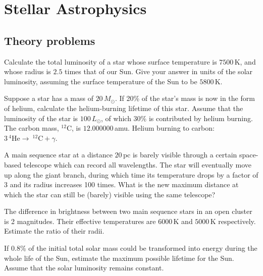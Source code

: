 \chapter{Stellar Astrophysics}

\section*{Theory problems}

Calculate the total luminosity of a star whose surface temperature is $7500$\,K,
and whose radius is $2.5$ times that of our Sun. Give your answer in units of the
solar luminosity, assuming the surface temperature of the Sun to be $5800$\,K.

Suppose a star has a mass of $20\,M_\odot$. If 20\% of the star's mass is now in
the form of helium, calculate the helium-burning lifetime of this star. Assume
that the luminosity of the star is $100\,L_\odot$, of which 30\% is contributed
by helium burning. The carbon mass, $^{12}$C, is $12.000000$\,amu. Helium
burning to carbon: $3\,^{4}\mathrm{He} \rightarrow\ ^{12}\mathrm{C} + \gamma$.

A main sequence star at a distance $20$\,pc is barely visible through a certain
space-based telescope which can record all wavelengths. The star will eventually
move up along the giant branch, during which time its temperature drops by a
factor of 3 and its radius increases 100 times. What is the new maximum distance
at which the star can still be (barely) visible using the same telescope?

The difference in brightness between two main sequence stars in an open cluster
is 2 magnitudes. Their effective temperatures are $6000$\,K and $5000$\,K
respectively. Estimate the ratio of their radii.

If 0.8\% of the initial total solar mass could be transformed into energy during
the whole life of the Sun, estimate the maximum possible lifetime for the Sun.
Assume that the solar luminosity remains constant.

